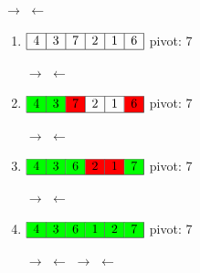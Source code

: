 \documentclass[12pt, letterpaper]{article}
\begin{document}
\begin{minipage}{0.8\textwidth}
	\hspace{1cm}$\rightarrow$
	\hspace{2.2cm}
	$\leftarrow$
	\begin{enumerate}
		\item 
		$\begin{array}{|l|c|c|c|c|r|}
			\hline
			4 & 3 & 7 & 2 & 1 & 6 \\
			\hline
		\end{array}$
		pivot: 7
		
		\hspace{1.2cm}$\rightarrow$
		\hspace{1cm}$\leftarrow$
		
		\item 
		$\begin{array}{|l|c|c|c|c|r|}
			\hline
			\cellcolor{green}{4} & \cellcolor{green}{3} & \cellcolor{red}{7} & 2
			& 1 & \cellcolor{red}{6}\\
			\hline
		\end{array}$
		pivot: 7
		
		\hspace{1.8cm}$\rightarrow$
		\hspace{0.02cm}$\leftarrow$
		
		\item
		$\begin{array}{|l|c|c|c|c|r|}
			\hline
			\cellcolor{green}{4} & \cellcolor{green}{3} & \cellcolor{green}{6} &
			\cellcolor{red}{2} & \cellcolor{red}{1} & \cellcolor{green}{7}\\
			\hline
		\end{array}$
		pivot: 7
		
		\hspace{1.8cm}$\rightarrow$
		\hspace{0.02cm}$\leftarrow$
		
		\item
		$\begin{array}{|l|c|c|c|c|r|}
			\hline
			\cellcolor{green}{4} & \cellcolor{green}{3} & \cellcolor{green}{6} &
			\cellcolor{green}{1} & \cellcolor{green}{2} & \cellcolor{green}{7}\\
			\hline
		\end{array}$
		pivot: 7
				
		$\rightarrow$
		\hspace{1.2cm}$\leftarrow$
		\hspace{1.75cm}$\rightarrow$
		\hspace{0.02cm}$\leftarrow$
		

\end{enumerate}
\end{minipage}
\end{document}
